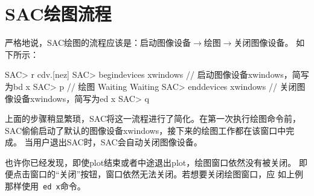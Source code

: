 \section{SAC绘图流程}
严格地说，SAC绘图的流程应该是：启动图像设备$\rightarrow$绘图$\rightarrow$关闭图像设备。
如下所示：
\begin{SACCode}
SAC> r cdv.[nez]
SAC> begindevices xwindows      // 启动图像设备xwindows，简写为bd x
SAC> p                          // 绘图
Waiting
Waiting
SAC> enddevices xwindows        // 关闭图像设备xwindows，简写为ed x
SAC> q
\end{SACCode}

上面的步骤稍显繁琐，SAC将这一流程进行了简化。在第一次执行绘图命令前，
SAC偷偷启动了默认的图像设备xwindows，接下来的绘图工作都在该窗口中完成。
当用户退出SAC时，SAC会自动关闭图像设备。

也许你已经发现，即使plot结束或者中途退出plot，绘图窗口依然没有被关闭。
即便点击窗口的``关闭''按钮，窗口依然无法关闭。若想要关闭绘图窗口，应
如上例那样使用~\verb+ed x+命令。
